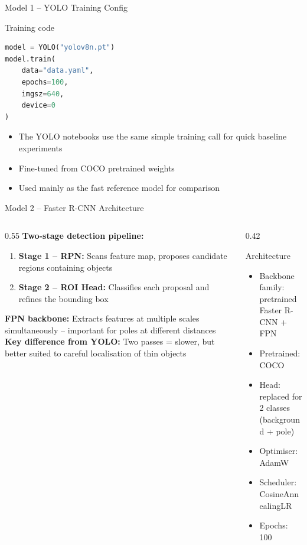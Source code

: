 \documentclass[aspectratio=169]{beamer}
\begin{document}
\begin{frame}[fragile,shrink=5]{Model 1 -- YOLO Training Config}
  \begin{block}{Training code}
\begin{lstlisting}[language=Python]
model = YOLO("yolov8n.pt")
model.train(
    data="data.yaml",
    epochs=100,
    imgsz=640,
    device=0
)
\end{lstlisting}
  \end{block}
  \begin{itemize}
    \item The YOLO notebooks use the same simple training call for quick baseline experiments
    \item Fine-tuned from COCO pretrained weights
    \item Used mainly as the fast reference model for comparison
  \end{itemize}
\end{frame}

\begin{frame}{Model 2 -- Faster R-CNN Architecture}
  \begin{columns}
    \begin{column}{0.55\textwidth}
      \textbf{Two-stage detection pipeline:}
      \begin{enumerate}
        \item \textbf{Stage 1 -- RPN:} Scans feature map, proposes candidate regions containing objects
        \item \textbf{Stage 2 -- ROI Head:} Classifies each proposal and refines the bounding box
      \end{enumerate}
      \vspace{0.5em}
      \textbf{FPN backbone:} Extracts features at multiple scales simultaneously -- important for poles at different distances
      \vspace{0.5em}
      \textbf{Key difference from YOLO:} Two passes = slower, but better suited to careful localisation of thin objects
    \end{column}
    \begin{column}{0.42\textwidth}
      \begin{block}{Architecture}
        \begin{itemize}
          \item Backbone family: pretrained Faster R-CNN + FPN
          \item Pretrained: COCO
          \item Head: replaced for 2 classes (background + pole)
          \item Optimiser: AdamW
          \item Scheduler: CosineAnnealingLR
          \item Epochs: 100
        \end{itemize}
      \end{block}
    \end{column}
  \end{columns}
\end{frame}
\end{document}
